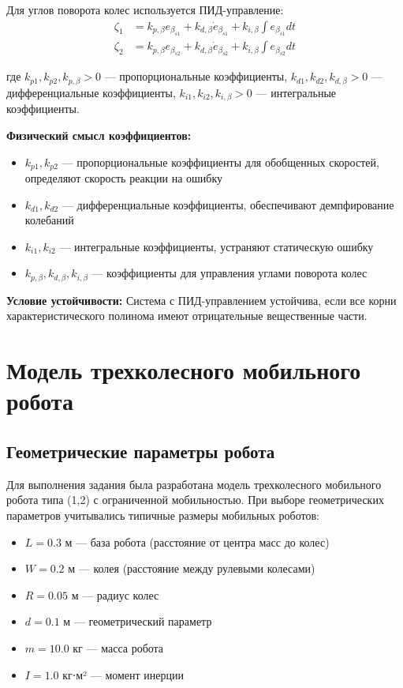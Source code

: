 Для углов поворота колес используется ПИД-управление:
\begin{align}
\zeta_1 &= k_{p,\beta} e_{\beta_{s1}} + k_{d,\beta} \dot{e}_{\beta_{s1}} + k_{i,\beta} \int e_{\beta_{s1}} dt \\
\zeta_2 &= k_{p,\beta} e_{\beta_{s2}} + k_{d,\beta} \dot{e}_{\beta_{s2}} + k_{i,\beta} \int e_{\beta_{s2}} dt
\end{align}

где $k_{p1}, k_{p2}, k_{p,\beta} > 0$ --- пропорциональные коэффициенты, $k_{d1}, k_{d2}, k_{d,\beta} > 0$ --- дифференциальные коэффициенты, $k_{i1}, k_{i2}, k_{i,\beta} > 0$ --- интегральные коэффициенты.

\textbf{Физический смысл коэффициентов:}
\begin{itemize}
\item $k_{p1}, k_{p2}$ --- пропорциональные коэффициенты для обобщенных скоростей, определяют скорость реакции на ошибку
\item $k_{d1}, k_{d2}$ --- дифференциальные коэффициенты, обеспечивают демпфирование колебаний
\item $k_{i1}, k_{i2}$ --- интегральные коэффициенты, устраняют статическую ошибку
\item $k_{p,\beta}, k_{d,\beta}, k_{i,\beta}$ --- коэффициенты для управления углами поворота колес
\end{itemize}

\textbf{Условие устойчивости:} Система с ПИД-управлением устойчива, если все корни характеристического полинома имеют отрицательные вещественные части.


\section{Модель трехколесного мобильного робота}

\subsection{Геометрические параметры робота}

Для выполнения задания была разработана модель трехколесного мобильного робота типа (1,2) с ограниченной мобильностью. При выборе геометрических параметров учитывались типичные размеры мобильных роботов:

\begin{itemize}
\item $L = 0.3$ м --- база робота (расстояние от центра масс до колес)
\item $W = 0.2$ м --- колея (расстояние между рулевыми колесами)
\item $R = 0.05$ м --- радиус колес
\item $d = 0.1$ м --- геометрический параметр
\item $m = 10.0$ кг --- масса робота
\item $I = 1.0$ кг⋅м² --- момент инерции
\end{itemize}

